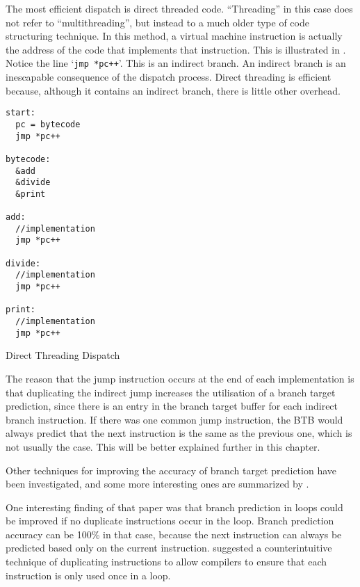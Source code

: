 		The most efficient dispatch is direct threaded code. ``Threading'' in this case does not refer to ``multithreading'', but instead to a much older type of code structuring technique. In this method, a virtual machine instruction is actually the address of the code that implements that instruction. This is illustrated in . Notice the line `\texttt{jmp *pc++}'. This is an indirect branch. An indirect branch is an inescapable consequence of the dispatch process. Direct threading is efficient because, although it contains an indirect branch, there is little other overhead.
		
		\begin{myfigure}
				\begin{lstlisting}
start:
  pc = bytecode
  jmp *pc++

bytecode:
  &add
  &divide
  &print

add:
  //implementation
  jmp *pc++

divide:
  //implementation
  jmp *pc++

print:
  //implementation
  jmp *pc++

				\end{lstlisting}
				\caption{Direct Threading Dispatch}
				\label{fig:directthreading}
		\end{myfigure}
		
		The reason that the jump instruction occurs at the end of each implementation is that duplicating the indirect jump increases the utilisation of a branch target prediction, since there is an entry in the branch target buffer for each indirect branch instruction. If there was one common jump instruction, the BTB would always predict that the next instruction is the same as the previous one, which is not usually the case. This will be better explained further in this chapter.
		
		Other techniques for improving the accuracy of branch target prediction have been investigated, and some more interesting ones are summarized by \cite{optimizingindirectbranch}. 
		
		One interesting finding of that paper was that branch prediction in loops could be improved if no duplicate instructions occur in the loop. Branch prediction accuracy can be 100\% in that case, because the next instruction can always be predicted based only on the current instruction. \citeauthor{optimizingindirectbranch} suggested a counterintuitive technique of duplicating instructions to allow compilers to ensure that each instruction is only used once in a loop.
		
